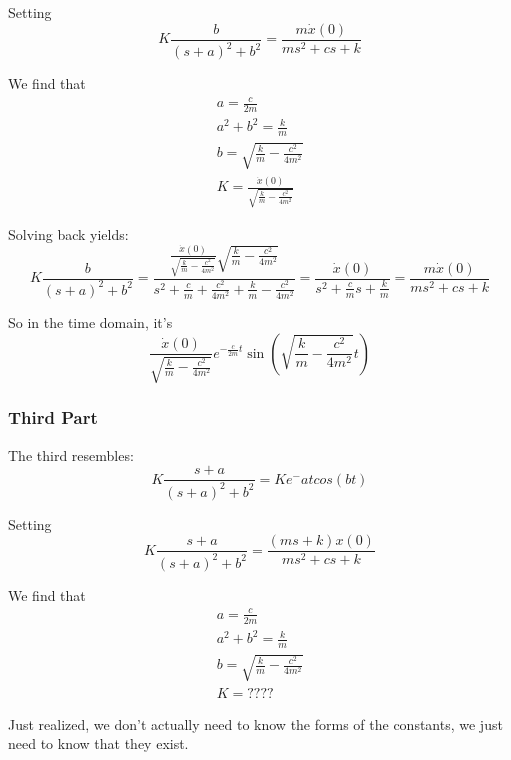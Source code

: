 \documentclass{article}
\begin{document}
Setting
\begin{equation*}
    K\frac{b}{(s+a)^2 + b^2} = \frac{m \dot{x}(0)}{ms^2 + cs + k}
\end{equation*}

We find that
\begin{gather*}
    a = \frac{c}{2m} \\
    a^2 + b^2 = \frac{k}{m} \\
    b = \sqrt{\frac{k}{m} - \frac{c^2}{4m^2}} \\
    K = \frac{\dot{x}(0)}{\sqrt{\frac{k}{m} - \frac{c^2}{4m^2}}}
\end{gather*}

Solving back yields:
\begin{equation*}
    K\frac{b}{(s+a)^2 + b^2} = \frac{\frac{\dot{x}(0)}{\sqrt{\frac{k}{m} - \frac{c^2}{4m^2}}} \sqrt{\frac{k}{m} - \frac{c^2}{4m^2}}}{s^2 + \frac{c}{m} + \frac{c^2}{4m^2} + \frac{k}{m} - \frac{c^2}{4m^2}} = \frac{\dot{x}(0)}{s^2 + \frac{c}{m}s + \frac{k}{m}} = \frac{m\dot{x}(0)}{ms^2 + cs + k}
\end{equation*}

So in the time domain, it's
\begin{equation*}
    \frac{\dot{x}(0)}{\sqrt{\frac{k}{m} - \frac{c^2}{4m^2}}} e^{-\frac{c}{2m}t}\sin(\sqrt{\frac{k}{m} - \frac{c^2}{4m^2}}t)
\end{equation*}


\subsubsection{Third Part}
The third resembles:
\begin{equation*}
    K\frac{s + a}{(s+a)^2 + b^2} = Ke^-{at}cos(bt)
\end{equation*}

Setting
\begin{equation*}
    K\frac{s + a}{(s+a)^2 + b^2} = \frac{(ms + k)x(0)}{ms^2 + cs + k}
\end{equation*}

We find that
\begin{gather*}
    a = \frac{c}{2m} \\
    a^2 + b^2 = \frac{k}{m} \\
    b = \sqrt{\frac{k}{m} - \frac{c^2}{4m^2}} \\
    K = ????
\end{gather*}

Just realized, we don't actually need to know the forms of the constants, we just need to know that they exist.
\end{document}
